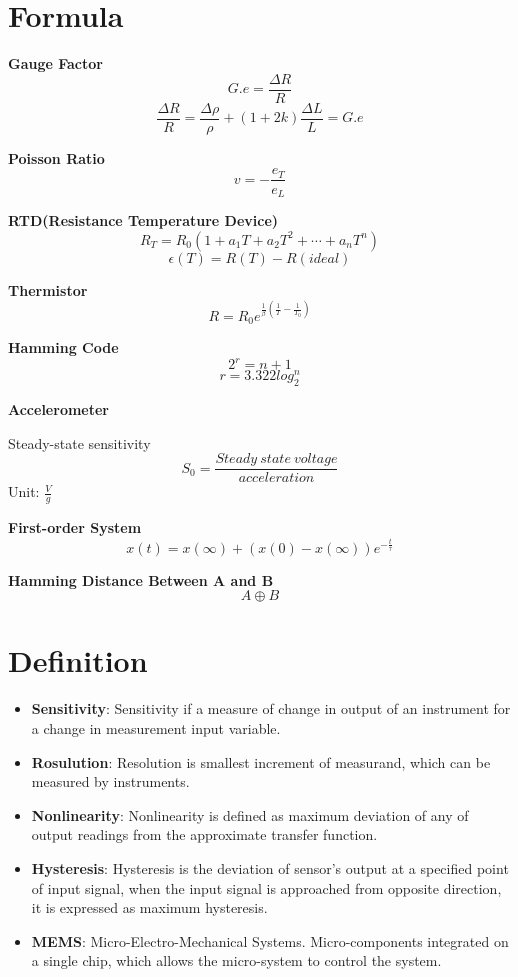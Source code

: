 \documentclass{article}
\begin{document}
\Large
  \section{Formula}
\textbf{Gauge Factor} $$ G.e = \frac{\Delta R}{R} $$
$$\frac{\Delta R}{R} = \frac{\Delta \rho}{\rho} + (1+2k)\frac{\Delta L}{L} = G.e$$

\textbf{Poisson Ratio}
$$v = -\frac{e_T}{e_L}$$

\textbf{RTD(Resistance Temperature Device)} 
$$R_T = R_0(1+a_1T + a_2T^2 + \cdots + a_nT^n)$$
$$\epsilon(T) = R(T) - R(ideal)$$


\textbf{Thermistor}
$$R = R_0e^{\frac{1}{\beta}(\frac{1}{T} - \frac{1}{T_0})}$$

\textbf{Hamming Code}
$$2^r = n+1$$
$$ r = 3.322log_2^n$$

\textbf{Accelerometer}

Steady-state sensitivity
$$ S_0 = \frac{Steady\ state \ voltage}{acceleration} $$ 
Unit: $\frac{V}{g}$

\textbf{First-order System}
$$x(t) = x(\infty) + (x(0) - x(\infty))e^{-\frac{t}{\tau}}$$

\textbf{Hamming Distance Between A and B}
$$A \oplus B$$



   \section{Definition}
   \begin{itemize}
    \item \textbf{Sensitivity}: Sensitivity if a measure of change in output of an instrument for a change in measurement input variable.
    \item \textbf{Rosulution}: Resolution is smallest increment of measurand, which can be measured by instruments.
    
    \item \textbf{Nonlinearity}: Nonlinearity is defined as maximum deviation of any of output readings from the approximate transfer function.
    
    \item \textbf{Hysteresis}: Hysteresis is the deviation of sensor's output at a specified point of input signal, when the input signal is approached from opposite direction, it is expressed as maximum hysteresis.
    
    \item \textbf{MEMS}: Micro-Electro-Mechanical Systems. Micro-components integrated on a single chip, which allows the micro-system to control the system.
   \end{itemize}
\end{document}
